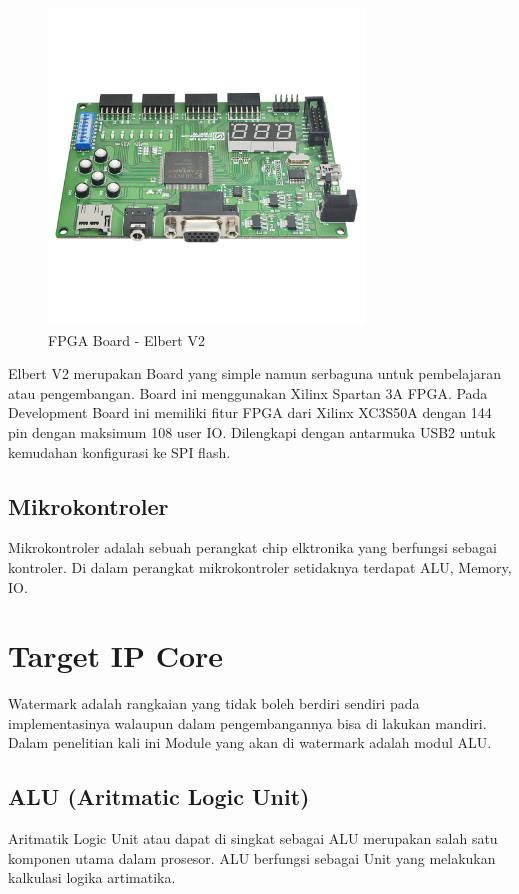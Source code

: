 \begin{figure}
	\centering
	\includegraphics[width=0.75\textwidth]
	{pics/elbertv2.jpg}
	\caption{FPGA Board - Elbert V2}
	\label{fig:fpga}
\end{figure}

Elbert V2 merupakan Board yang simple namun serbaguna untuk pembelajaran atau pengembangan. Board ini menggunakan Xilinx Spartan 3A FPGA. Pada Development Board ini memiliki fitur FPGA dari Xilinx XC3S50A dengan 144 pin dengan maksimum 108 user IO. Dilengkapi dengan antarmuka USB2 untuk kemudahan konfigurasi ke SPI flash. 

\subsection{Mikrokontroler}
Mikrokontroler adalah sebuah perangkat chip elktronika yang berfungsi sebagai kontroler. Di dalam perangkat mikrokontroler setidaknya terdapat ALU, Memory, IO.

\section{Target IP Core}
Watermark adalah rangkaian yang tidak boleh berdiri sendiri pada implementasinya walaupun dalam pengembangannya bisa di lakukan mandiri. Dalam penelitian kali ini Module yang akan di watermark adalah modul ALU.

\subsection{ALU (Aritmatic Logic Unit)}
Aritmatik Logic Unit atau dapat di singkat sebagai ALU merupakan salah satu komponen utama dalam prosesor. ALU berfungsi sebagai Unit yang melakukan kalkulasi logika artimatika.
